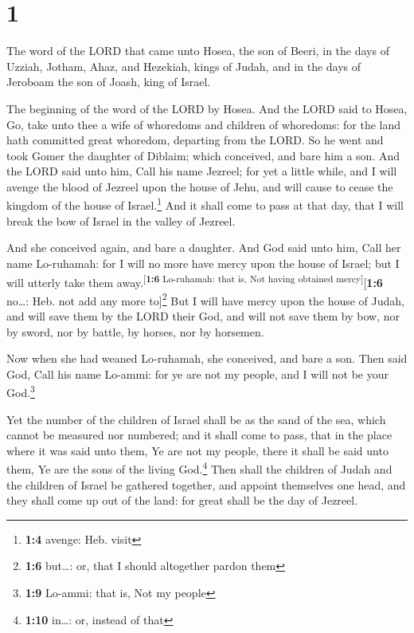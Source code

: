 \hypertarget{section}{%
\section{1}\label{section}}

 The word of the LORD that came unto Hosea, the son of
Beeri, in the days of Uzziah, Jotham, Ahaz, and Hezekiah, kings of
Judah, and in the days of Jeroboam the son of Joash, king of Israel.

 The beginning of the word of the LORD by Hosea. And the
LORD said to Hosea, Go, take unto thee a wife of whoredoms and children
of whoredoms: for the land hath committed great whoredom, departing from
the LORD.  So he went and took Gomer the daughter of
Diblaim; which conceived, and bare him a son.  And the
LORD said unto him, Call his name Jezreel; for yet a little while, and I
will avenge the blood of Jezreel upon the house of Jehu, and will cause
to cease the kingdom of the house of Israel.\footnote{\textbf{1:4}
  avenge: Heb. visit}  And it shall come to pass at that
day, that I will break the bow of Israel in the valley of Jezreel.

 And she conceived again, and bare a daughter. And God
said unto him, Call her name Lo-ruhamah: for I will no more have mercy
upon the house of Israel; but I will utterly take them
away.\textsuperscript{{[}\textbf{1:6} Lo-ruhamah: that is, Not having
obtained mercy{]}}{[}\textbf{1:6} no\ldots: Heb. not add any more
to{]}\footnote{\textbf{1:6} but\ldots: or, that I should altogether
  pardon them}  But I will have mercy upon the house of
Judah, and will save them by the LORD their God, and will not save them
by bow, nor by sword, nor by battle, by horses, nor by horsemen.

 Now when she had weaned Lo-ruhamah, she conceived, and
bare a son.  Then said God, Call his name Lo-ammi: for ye
are not my people, and I will not be your God.\footnote{\textbf{1:9}
  Lo-ammi: that is, Not my people}

 Yet the number of the children of Israel shall be as the
sand of the sea, which cannot be measured nor numbered; and it shall
come to pass, that in the place where it was said unto them, Ye are not
my people, there it shall be said unto them, Ye are the sons of the
living God.\footnote{\textbf{1:10} in\ldots: or, instead of that}
 Then shall the children of Judah and the children of
Israel be gathered together, and appoint themselves one head, and they
shall come up out of the land: for great shall be the day of Jezreel.

